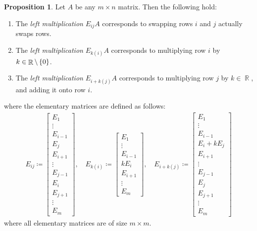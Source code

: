 \documentclass{amsart}
\theoremstyle{definition}
\newtheorem{proposition}[definition]{Proposition}
\theoremstyle{definition}
\DeclareMathOperator{\R}{\mathbb{R}}
\DeclareMathOperator{\1}{\mathbbm{1}}
\begin{document}
\begin{enumerate}[itemsep = 2mm]
		\begin{proposition}
			\label{prop1}
			Let $A$ be any $m\times n$ matrix. Then the following hold:
			\begin{enumerate}
				\item The \textit{left multiplication} $E_{ij} A$ corresponds to swapping rows $i$ and $j$ actually swaps rows. 
				\item The \textit{left multiplication} $E_{k (i)} A$ corresponds to multiplying row $i$ by $k \in \R \setminus \set{0}$.
				\item The \textit{left multiplication} $E_{i + k (j)} A$ corresponds to multiplying row $j$ by $k \in \R$, and adding it onto row $i$.
			\end{enumerate}
			where the elementary matrices are defined as follows:
			\begin{align*}
			E_{ij} \coloneqq \begin{bmatrix} E_1 \\ \vdots \\ E_{i-1} \\ E_{j} \\ E_{i+1} \\ \vdots \\ E_{j-1} \\ E_i \\ E_{j+1} \\ \vdots \\ E_m \end{bmatrix}, \quad 
			E_{k(i)} \coloneqq \begin{bmatrix} E_1 \\ \vdots \\ E_{i-1} \\ k E_{i} \\ E_{i+1} \\ \vdots \\ E_m \end{bmatrix}, \quad
			E_{i + k(j)} \coloneqq \begin{bmatrix} E_1 \\ \vdots \\ E_{i-1} \\ E_{i} + k E_{j} \\ E_{i+1} \\ \vdots \\ E_{j-1} \\ E_j \\ E_{j+1} \\ \vdots \\ E_m \end{bmatrix}
			\end{align*}
			where all elementary matrices are of size $m \times m$.
		\end{proposition}
		

\end{enumerate}
\end{document}
